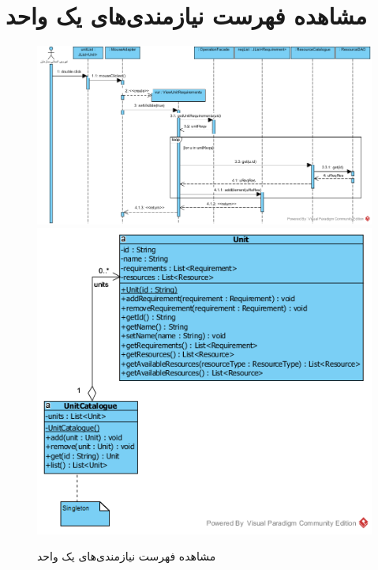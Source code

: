 \section{مشاهده فهرست نیازمندی‌های یک واحد}
\begin{figure}[H]
	\centering
	\includegraphics[scale=0.7]{img/sequence-design/ViewListOfRequirements}
	\includegraphics[scale=0.7]{img/sequence-design/ViewListOfRequirementsC}
	\caption{مشاهده فهرست نیازمندی‌های یک واحد}
\end{figure}

